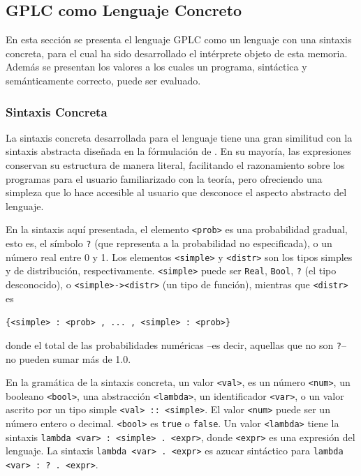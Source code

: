 \subsection{GPLC como Lenguaje Concreto}\label{sec:concrete-gplc}

En esta sección se presenta el lenguaje GPLC como un lenguaje con una sintaxis concreta, para el cual ha sido desarrollado el intérprete objeto de esta memoria. Además se presentan los valores a los cuales un programa, sintáctica y semánticamente correcto, puede ser evaluado.

\subsubsection{Sintaxis Concreta}
La sintaxis concreta desarrollada para el lenguaje tiene una gran similitud con la sintaxis abstracta diseñada en la fórmulación de \cite{gplc}. En su mayoría, las expresiones conservan su estructura de manera literal, facilitando el razonamiento sobre los programas para el usuario familiarizado con la teoría, pero ofreciendo una simpleza que lo hace accesible al usuario que desconoce el aspecto abstracto del lenguaje.

En la sintaxis aquí presentada, el elemento \lstinline|<prob>| es una probabilidad gradual, esto es, el símbolo \lstinline|?| (que representa a la probabilidad no especificada), o un número real entre 0 y 1. Los elementos \lstinline|<simple>| y \lstinline|<distr>| son los tipos simples y de distribución, respectivamente. \lstinline|<simple>| puede ser \lstinline|Real|, \lstinline|Bool|, \lstinline|?| (el tipo desconocido), o \lstinline|<simple>|\texttt{->}\lstinline|<distr>| (un tipo de función), mientras que \lstinline|<distr>| es
\begin{center}
  \lstinline|{<simple> : <prob> , ... , <simple> : <prob>}|
\end{center}
donde el total de las probabilidades numéricas --es decir, aquellas que no son \lstinline|?|-- no pueden sumar más de 1.0.

En la gramática de la sintaxis concreta, un valor \verb|<val>|, es un número \verb|<num>|, un booleano \verb|<bool>|, una abstracción \verb|<lambda>|, un identificador \lstinline|<var>|, o un valor ascrito por un tipo simple \lstinline|<val> :: <simple>|. El valor \lstinline|<num>| puede ser un número entero o decimal. \lstinline|<bool>| es \lstinline|true| o \lstinline|false|. Un valor \verb|<lambda>| tiene la sintaxis \lstinline|lambda <var> : <simple> . <expr>|, donde \lstinline|<expr>| es una expresión del lenguaje. La sintaxis \lstinline|lambda <var> . <expr>| es azucar sintáctico para \lstinline|lambda <var> : ? . <expr>|.

